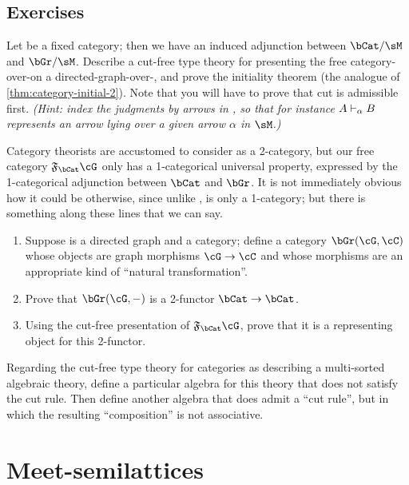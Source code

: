 \subsection*{Exercises}

\begin{ex}\label{ex:categories-over}
  Let \sM be a fixed category; then we have an induced adjunction between $\bCat/\sM$ and $\bGr/\sM$.
  Describe a cut-free type theory for presenting the free category-over-\sM on a directed-graph-over-\sM, and prove the initiality theorem (the analogue of \cref{thm:category-initial-2}).
  Note that you will have to prove that cut is admissible first.
  \textit{(Hint: index the judgments by arrows in \sM, so that for instance $A\vdash_\alpha B$ represents an arrow lying over a given arrow $\alpha$ in $\sM$.)}
\end{ex}

\begin{ex}\label{ex:cat-2free}
  Category theorists are accustomed to consider \bCat as a 2-category, but our free category $\F\bCat\cG$ only has a 1-categorical universal property, expressed by the 1-categorical adjunction between $\bCat$ and $\bGr$.
  It is not immediately obvious how it could be otherwise, since unlike \bCat, \bGr is only a 1-category; but there is something along these lines that we can say.
  \begin{enumerate}
  \item Suppose \cG is a directed graph and \cC a category; define a category $\bGr(\cG,\cC)$ whose objects are graph morphisms $\cG\to\cC$ and whose morphisms are an appropriate kind of ``natural transformation''.
  \item Prove that $\bGr(\cG,-)$ is a 2-functor $\bCat\to\bCat$.
  \item Using the cut-free presentation of $\F\bCat\cG$, prove that it is a representing object for this 2-functor.
  \end{enumerate}
\end{ex}

\begin{ex}\label{ex:nonfree-noadm}
  Regarding the cut-free type theory for categories as describing a multi-sorted algebraic theory, define a particular algebra for this theory that does not satisfy the cut rule.
  Then define another algebra that does admit a ``cut rule'', but in which the resulting ``composition'' is not associative.
\end{ex}


\section{Meet-semilattices}
\label{sec:mslat}

